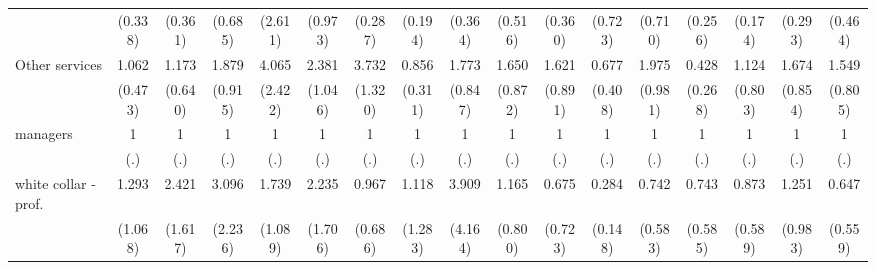 {\begin{tabular}{l*{16}{c}}
                    &     (0.338)         &     (0.361)         &     (0.685)         &     (2.611)         &     (0.973)         &     (0.287)         &     (0.194)         &     (0.364)         &     (0.516)         &     (0.360)         &     (0.723)         &     (0.710)         &     (0.256)         &     (0.174)         &     (0.293)         &     (0.464)         \\
[1em]
Other services      &       1.062         &       1.173         &       1.879         &       4.065\sym{*}  &       2.381\sym{*}  &       3.732\sym{***}&       0.856         &       1.773         &       1.650         &       1.621         &       0.677         &       1.975         &       0.428         &       1.124         &       1.674         &       1.549         \\
                    &     (0.473)         &     (0.640)         &     (0.915)         &     (2.422)         &     (1.046)         &     (1.320)         &     (0.311)         &     (0.847)         &     (0.872)         &     (0.891)         &     (0.408)         &     (0.981)         &     (0.268)         &     (0.803)         &     (0.854)         &     (0.805)         \\
[1em]
managers            &           1         &           1         &           1         &           1         &           1         &           1         &           1         &           1         &           1         &           1         &           1         &           1         &           1         &           1         &           1         &           1         \\
                    &         (.)         &         (.)         &         (.)         &         (.)         &         (.)         &         (.)         &         (.)         &         (.)         &         (.)         &         (.)         &         (.)         &         (.)         &         (.)         &         (.)         &         (.)         &         (.)         \\
[1em]
white collar - prof.&       1.293         &       2.421         &       3.096         &       1.739         &       2.235         &       0.967         &       1.118         &       3.909         &       1.165         &       0.675         &       0.284\sym{*}  &       0.742         &       0.743         &       0.873         &       1.251         &       0.647         \\
                    &     (1.068)         &     (1.617)         &     (2.236)         &     (1.089)         &     (1.706)         &     (0.686)         &     (1.283)         &     (4.164)         &     (0.800)         &     (0.723)         &     (0.148)         &     (0.583)         &     (0.585)         &     (0.589)         &     (0.983)         &     (0.559)         \\

\end{tabular}}
